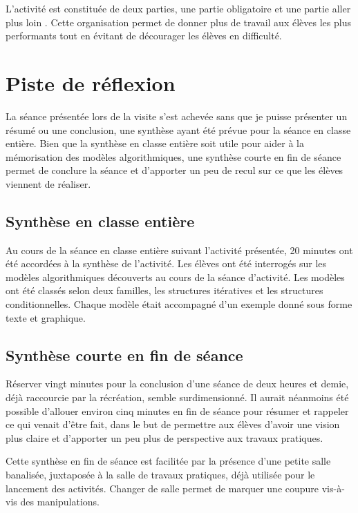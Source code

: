 \documentclass[pdftex,a4paper,12pt]{article}
\begin{document}
	L'activité est constituée de deux parties, une partie \og{} obligatoire \fg{} et une partie \og{} aller plus loin \fg{}.
	Cette organisation permet de donner plus de travail aux élèves les plus performants tout en évitant de décourager les élèves en difficulté.

	\section{Piste de réflexion}
	La séance présentée lors de la visite s'est achevée sans que je puisse présenter un résumé ou une conclusion, 
	une synthèse ayant été prévue pour la séance en classe entière.
	Bien que la synthèse en classe entière soit utile pour aider à la mémorisation des modèles algorithmiques, 
	une synthèse courte en fin de séance permet de conclure la séance et d'apporter un peu de recul sur ce que les élèves viennent de réaliser.

	\subsection{Synthèse en classe entière}
	Au cours de la séance en classe entière suivant l'activité présentée, 20 minutes ont été accordées à la synthèse de l'activité.
	Les élèves ont été interrogés sur les modèles algorithmiques découverts au cours de la séance d'activité.
	Les modèles ont été classés selon deux familles, les structures itératives et les structures conditionnelles.
	Chaque modèle était accompagné d'un exemple donné sous forme texte et graphique.

	\subsection{Synthèse courte en fin de séance}
	Réserver vingt minutes pour la conclusion d'une séance de deux heures et demie, déjà raccourcie par la récréation, semble surdimensionné.
	Il aurait néanmoins été possible d'allouer environ cinq minutes en fin de séance pour résumer et rappeler ce qui venait d'être fait,
	dans le but de permettre aux élèves d'avoir une vision plus claire et d'apporter un peu plus de perspective aux travaux pratiques.

	Cette synthèse en fin de séance est facilitée par la présence d'une petite salle banalisée, juxtaposée à la salle de travaux pratiques,
	déjà utilisée pour le lancement des activités.
	Changer de salle permet de marquer une coupure vis-à-vis des manipulations.
\end{document}
